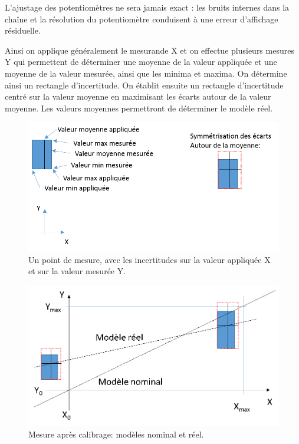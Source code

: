 L'ajustage des potentiomètres ne sera jamais exact : les bruits internes dans la chaîne et  la résolution du potentiomètre conduisent à une erreur d'affichage résiduelle.

Ainsi on applique généralement le mesurande X et on effectue plusieurs mesures Y qui permettent de déterminer une moyenne de la valeur appliquée et une moyenne de la valeur mesurée, ainsi que les minima et maxima. On détermine ainsi un rectangle d'incertitude. On établit ensuite un rectangle d'incertitude centré sur la valeur moyenne en maximisant les écarts autour de la valeur moyenne. Les valeurs moyennes permettront de déterminer le modèle réel.

\begin{figure}
\centering
\includegraphics[width=12cm]{assets/figures/3_3_explications.PNG}
\caption{Un point de mesure, avec les incertitudes sur la valeur appliquée X et sur la valeur mesurée Y.}
\label{fig:3_3_explications}
\end{figure}

\begin{figure}
\centering
\includegraphics[width=12cm]{assets/figures/3_3a_reel_versus_nominal.PNG}
\caption{Mesure après calibrage: modèles nominal et réel.}
\label{fig:3_3a_reel_versus_nominal}
\end{figure}

